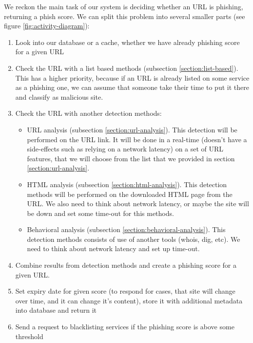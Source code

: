 \documentclass[
  digital, %
  oneside, %
  table,   %
  nolof,     %
  nolot,     %
]{fithesis3}
\newcounter{feature}
\begin{document}
We reckon the main task of our system is deciding whether an URL is phishing, returning a phish score. We can split this problem into several smaller parts (see figure \ref{fig:activity-diagram}):
\begin{enumerate}
    \item Look into our database or a cache, whether we have already phishing score for a given URL
    \item Check the URL with a list based methods (subsection \ref{section:list-based}). This has a higher priority, because if an URL is already listed on some service as a phishing one, we can assume that someone take their time to put it there and classify as malicious site.
    \item Check the URL with another detection methods:
    \begin{itemize}
        \item URL analysis (subsection \ref{section:url-analysis}). This detection will be performed on the URL link. It will be done in a real-time (doesn't have a side-effects such as relying on a network latency) on a set of URL features, that we will choose from the list that we provided in section \ref{section:url-analysis}. 
        \item HTML analysis (subsection \ref{section:html-analysis}). This detection methods will be performed on the downloaded HTML page from the URL. We also need to think about network latency, or maybe the site will be down and set some time-out for this methods.
        \item Behavioral analysis (subsection \ref{section:behavioral-analysis}). This detection methods consists of use of another tools (whois, dig, etc). We need to think about network latency and set up time-out.
    \end{itemize}
    \item Combine results from detection methods and create a phishing score for a given URL.
    \item Set expiry date for given score (to respond for cases, that site will change over time, and it can change it's content), store it with additional metadata into database and return it
    \item Send a request to blacklisting services if the phishing score is above some threshold
\end{enumerate}
\end{document}
